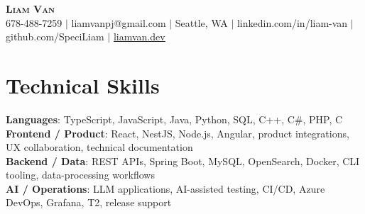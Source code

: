 \documentclass[letterpaper,11pt]{article}
\begin{document}

%
\begin{center}
    \textbf{\Huge \scshape Liam Van} \\ \vspace{1pt}
    \small 678-488-7259 $|$ \small {liamvanpj@gmail.com} $|$ Seattle, WA
 {{$|$ linkedin.com/in/liam-van} {$|$ github.com/SpeciLiam} {$|$ \href{https://liamvan.dev}{liamvan.dev}}}

\end{center}

\section{Technical Skills}
 \begin{itemize}[leftmargin=0.15in, label={}]
    \small{\item{
     \textbf{Languages}{: TypeScript, JavaScript, Java, Python, SQL, C++, C\#, PHP, C} \\
     \textbf{Frontend / Product}{: React, NestJS, Node.js, Angular, product integrations, UX collaboration, technical documentation} \\
     \textbf{Backend / Data}{: REST APIs, Spring Boot, MySQL, OpenSearch, Docker, CLI tooling, data-processing workflows} \\
     \textbf{AI / Operations}{: LLM applications, AI-assisted testing, CI/CD, Azure DevOps, Grafana, T2, release support} \\
    }}
 \end{itemize}
%

\end{document}
